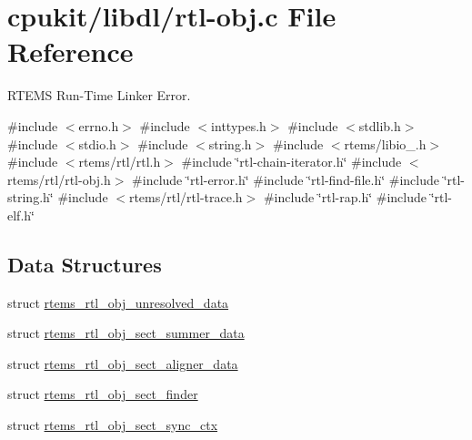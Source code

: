 \hypertarget{rtl-obj_8c}{}\section{cpukit/libdl/rtl-\/obj.c File Reference}
\label{rtl-obj_8c}


R\+T\+E\+MS Run-\/\+Time Linker Error.  


{\ttfamily \#include $<$errno.\+h$>$}\newline
{\ttfamily \#include $<$inttypes.\+h$>$}\newline
{\ttfamily \#include $<$stdlib.\+h$>$}\newline
{\ttfamily \#include $<$stdio.\+h$>$}\newline
{\ttfamily \#include $<$string.\+h$>$}\newline
{\ttfamily \#include $<$rtems/libio\+\_\+.\+h$>$}\newline
{\ttfamily \#include $<$rtems/rtl/rtl.\+h$>$}\newline
{\ttfamily \#include \char`\"{}rtl-\/chain-\/iterator.\+h\char`\"{}}\newline
{\ttfamily \#include $<$rtems/rtl/rtl-\/obj.\+h$>$}\newline
{\ttfamily \#include \char`\"{}rtl-\/error.\+h\char`\"{}}\newline
{\ttfamily \#include \char`\"{}rtl-\/find-\/file.\+h\char`\"{}}\newline
{\ttfamily \#include \char`\"{}rtl-\/string.\+h\char`\"{}}\newline
{\ttfamily \#include $<$rtems/rtl/rtl-\/trace.\+h$>$}\newline
{\ttfamily \#include \char`\"{}rtl-\/rap.\+h\char`\"{}}\newline
{\ttfamily \#include \char`\"{}rtl-\/elf.\+h\char`\"{}}\newline
\subsection*{Data Structures}
\begin{DoxyCompactItemize}
\item 
struct \mbox{\hyperlink{structrtems__rtl__obj__unresolved__data}{rtems\+\_\+rtl\+\_\+obj\+\_\+unresolved\+\_\+data}}
\item 
struct \mbox{\hyperlink{structrtems__rtl__obj__sect__summer__data}{rtems\+\_\+rtl\+\_\+obj\+\_\+sect\+\_\+summer\+\_\+data}}
\item 
struct \mbox{\hyperlink{structrtems__rtl__obj__sect__aligner__data}{rtems\+\_\+rtl\+\_\+obj\+\_\+sect\+\_\+aligner\+\_\+data}}
\item 
struct \mbox{\hyperlink{structrtems__rtl__obj__sect__finder}{rtems\+\_\+rtl\+\_\+obj\+\_\+sect\+\_\+finder}}
\item 
struct \mbox{\hyperlink{structrtems__rtl__obj__sect__sync__ctx}{rtems\+\_\+rtl\+\_\+obj\+\_\+sect\+\_\+sync\+\_\+ctx}}
\end{DoxyCompactItemize}
